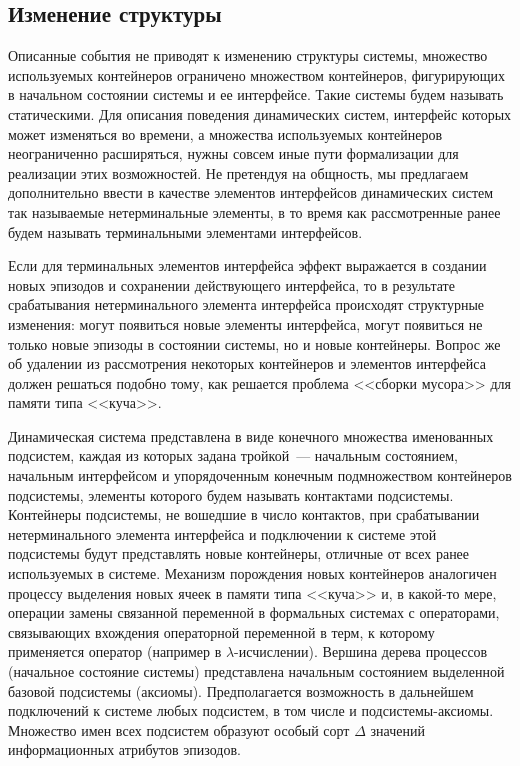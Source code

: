 \subsection{Изменение структуры}
Описанные события не приводят к изменению структуры системы, множество используемых контейнеров ограничено множеством контейнеров, фигурирующих в начальном состоянии системы и ее интерфейсе. 
Такие системы будем называть статическими. 
Для описания поведения динамических систем, интерфейс которых может изменяться во времени, а множества используемых контейнеров неограниченно расширяться, нужны совсем иные пути формализации для реализации этих возможностей. 
Не претендуя на общность, мы предлагаем дополнительно ввести в качестве элементов интерфейсов динамических систем так называемые нетерминальные элементы, в то время как рассмотренные ранее будем называть терминальными элементами интерфейсов. 

Если для терминальных элементов интерфейса эффект выражается в создании новых эпизодов и сохранении действующего интерфейса, то в результате срабатывания нетерминального элемента интерфейса происходят структурные изменения: могут появиться новые элементы интерфейса, могут появиться не только новые эпизоды в состоянии системы, но и новые контейнеры. 
Вопрос же об удалении из рассмотрения некоторых контейнеров и элементов интерфейса должен решаться подобно тому, как решается проблема <<сборки мусора>> для памяти типа <<куча>>.

Динамическая система представлена в виде конечного множества именованных подсистем, каждая из которых задана тройкой~--- начальным состоянием, начальным интерфейсом и упорядоченным конечным подмножеством контейнеров подсистемы, элементы которого будем называть контактами подсистемы. 
Контейнеры подсистемы, не вошедшие в число контактов, при срабатывании нетерминального элемента интерфейса и подключении к системе этой подсистемы будут представлять новые контейнеры, отличные от всех ранее используемых в системе. 
Механизм порождения новых контейнеров аналогичен процессу выделения новых ячеек в памяти типа <<куча>> и, в какой-то мере, операции замены связанной переменной в формальных системах с операторами, связывающих вхождения операторной переменной в терм, к которому применяется оператор (например в $ \lambda $-исчислении). 
Вершина дерева процессов (начальное состояние системы) представлена начальным состоянием выделенной базовой подсистемы (аксиомы). 
Предполагается возможность в дальнейшем подключений к системе любых подсистем, в том числе и подсистемы-аксиомы. 
Множество имен всех подсистем образуют особый сорт $ \Delta $ значений информационных атрибутов эпизодов.

